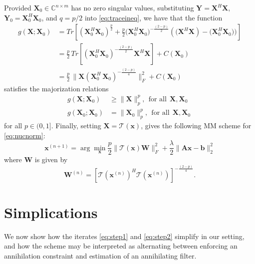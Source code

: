 \documentclass[10pt, twocolumn, twoside]{IEEEtran}
\newcommand{\mbf}{\mathbf}
\begin{document}
Provided $\mbf X_0 \in \mathbb{C}^{n\times m}$ has no zero singular values, substituting $\mbf Y = \mbf X^H\mbf X$, $\mbf Y_0 = \mbf X_0^H\mbf X_0$, and $q=p/2$ into \eqref{eq:traceineq}, we have that the function
\begin{align*}
g( \mbf X; \mbf X_0) & = 
Tr[(\mbf X_0^H \mbf X_0)^{\frac{p}{2}} + \frac{p}{2} \mbf (\mbf X_0^H \mbf X_0)^{-\frac{(2-p)}{2}}(\mbf (\mbf X^H \mbf X) -\mbf (\mbf X_0^H \mbf X_0))]\\
& = \frac{p}{2}\,Tr[(\mbf X_0^H \mbf X_0)^{-\frac{(2-p)}{2}}\mbf X^H \mbf X] + C(\mbf X_0)\\
& = \frac{p}{2}\,\| \mbf X (\mbf X_0^H \,\mbf X_0)^{-\frac{(2-p)}{4}}\|_F^2 + C(\mbf X_0)
\end{align*}
satisfies the majorization relations
\begin{align}\label{eq:MM1a}
g(\mbf X; \mbf X_0) & \geq \|\mbf X\|_p^p,~~\text{for all}~~\mbf X, \mbf X_0\\
g(\mbf X_0; \mbf X_0) & = \|\mbf X_0\|_p^p,~~\text{for all}~~\mbf X, \mbf X_0 \
\label{eq:MM2a}
\end{align}
for all $p \in (0,1]$. Finally, setting $\mbf X = \mathcal{T}(\mbf x)$, gives the following MM scheme for \eqref{eq:nucnorm}:
\begin{equation}
\mbf x^{(n+1)} = \arg \min_{\mbf x} \frac{p}{2}\|\mathcal{T}(\mbf x) \mbf W\|_F^2 + \frac{\lambda}{2}\|\mbf A \mbf x -\mbf b\|_2^2
\label{eq:step1}
\end{equation}
where $\mbf W$ is given by
\begin{equation}
\mbf W^{(n)} = [\mathcal{T}(\mbf x^{(n)})^H\mathcal{T}(\mbf x^{(n)})]^{-\frac{(2-p)}{4}}.
\label{eq:step2}
\end{equation}
\section{Simplications}
We now show how the iterates \eqref{eq:step1} and \eqref{eq:step2} simplify in our setting, and how the scheme may be interpreted as alternating between enforcing an annihilation constraint and estimation of an annihilating filter.
\end{document}
